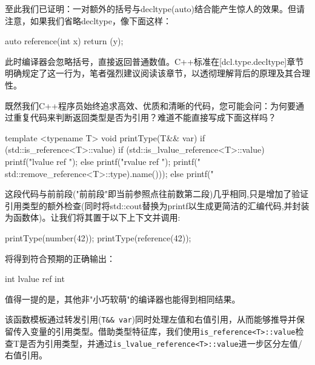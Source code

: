 至此我们已证明：一对额外的括号与decltype(auto)结合能产生惊人的效果。但请注意，如果我们省略decltype，像下面这样：

\begin{cpp}
auto reference(int x) {
  return (y);
}
\end{cpp}

此时编译器会忽略括号，直接返回普通数值。C++标准在[dcl.type.decltype]章节明确规定了这一行为，笔者强烈建议阅读该章节，以透彻理解背后的原理及其合理性。

既然我们C++程序员始终追求高效、优质和清晰的代码，您可能会问：为何要通过重复代码来判断返回类型是否为引用？难道不能直接写成下面这样吗？

\begin{cpp}
template <typename T>
void printType(T&& var) {
  if (std::is_reference<T>::value) {
    if (std::is_lvalue_reference<T>::value) {
      printf("lvalue ref ");
    } else {
      printf("rvalue ref ");
    }
    printf("%
    std::remove_reference<T>::type).name()));
  } else {
    printf("%
  }
}
\end{cpp}

这段代码与前前段("前前段"即当前参照点往前数第二段)几乎相同,只是增加了验证引用类型的额外检查(同时将std::cout替换为printf以生成更简洁的汇编代码,并封装为函数体)。让我们将其置于以下上下文并调用:

\begin{cpp}
printType(number(42));
printType(reference(42));
\end{cpp}

将得到符合预期的正确输出：

\begin{shell}
int
lvalue ref int
\end{shell}

值得一提的是，其他非"小巧软萌"的编译器也能得到相同结果。

该函数模板通过转发引用(\verb|T&& var|)同时处理左值和右值引用，从而能够推导并保留传入变量的引用类型。借助类型特征库，我们使用\verb|is_reference<T>::value|检查T是否为引用类型，并通过\verb|is_lvalue_reference<T>::value|进一步区分左值/右值引用。

